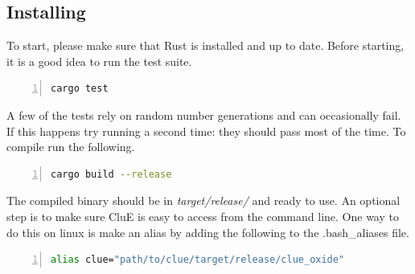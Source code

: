 \documentclass{book}
\begin{document}
\subsection{Installing}
To start, please make sure that Rust is installed and up to date\cite{rust}.
Before starting, it is a good idea to run the test suite.
\begin{lstlisting}[frame=single,numbers=left,language=bash]
cargo test
\end{lstlisting}
A few of the tests rely on random number generations and can occasionally fail.
If this happens try running a second time: they should pass most of the time.
To compile run the following.
\begin{lstlisting}[frame=single,numbers=left,language=bash]
cargo build --release
\end{lstlisting}
The compiled binary should be in \textit{target/release/} and ready to use.
An optional step is to make sure CluE is easy to access from the command line.
One way to do this on linux is make an alias by adding the following to 
the .bash\_aliases file.
\begin{lstlisting}[frame=single,numbers=left,language=bash]
alias clue="path/to/clue/target/release/clue_oxide"
\end{lstlisting}

\end{document}
